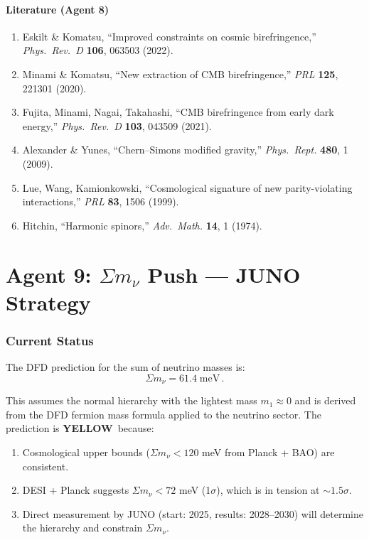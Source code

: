 \documentclass[11pt,a4paper]{article}
\newcommand{\YELLOW}{\textcolor{dfdyellow}{\textbf{YELLOW}}}
\begin{document}
\subsection{Literature (Agent 8)}

\begin{enumerate}
\item Eskilt \& Komatsu, ``Improved constraints on cosmic birefringence,'' \textit{Phys.\ Rev.\ D} \textbf{106}, 063503 (2022).
\item Minami \& Komatsu, ``New extraction of CMB birefringence,'' \textit{PRL} \textbf{125}, 221301 (2020).
\item Fujita, Minami, Nagai, Takahashi, ``CMB birefringence from early dark energy,'' \textit{Phys.\ Rev.\ D} \textbf{103}, 043509 (2021).
\item Alexander \& Yunes, ``Chern--Simons modified gravity,'' \textit{Phys.\ Rept.} \textbf{480}, 1 (2009).
\item Lue, Wang, Kamionkowski, ``Cosmological signature of new parity-violating interactions,'' \textit{PRL} \textbf{83}, 1506 (1999).
\item Hitchin, ``Harmonic spinors,'' \textit{Adv.\ Math.} \textbf{14}, 1 (1974).
\end{enumerate}


\part{Agent 9: $\Sigma m_\nu$ Push --- JUNO Strategy}
\label{part:nu-mass}

\section{Current Status}

The DFD prediction for the sum of neutrino masses is:
\begin{equation}
\Sigma m_\nu = 61.4\;\mathrm{meV}\,.
\end{equation}

This assumes the normal hierarchy with the lightest mass $m_1 \approx 0$ and is derived from the DFD fermion mass formula applied to the neutrino sector. The prediction is \YELLOW\ because:
\begin{enumerate}
\item Cosmological upper bounds ($\Sigma m_\nu < 120$ meV from Planck + BAO) are consistent.
\item DESI + Planck suggests $\Sigma m_\nu < 72$ meV (1$\sigma$), which is in tension at $\sim 1.5\sigma$.
\item Direct measurement by JUNO (start: 2025, results: 2028--2030) will determine the hierarchy and constrain $\Sigma m_\nu$.
\end{enumerate}
\end{document}
